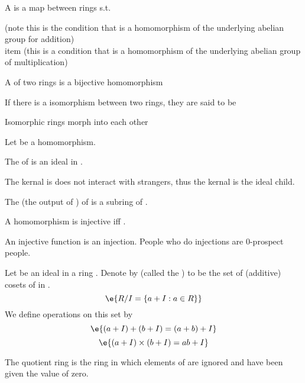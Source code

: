 \begin{D} A  is a map  between rings s.t.  
\begin{compactitem}
\item {} (note this is the condition that \e{$\varphi$} is a homomorphism of the underlying abelian group for addition)
\\item {} (this is a condition that \e{$\varphi$} is a homomorphism of the underlying abelian group of multiplication)
\end{compactitem}
\end{D}

\begin{D} A  of two rings is a bijective homomorphism \end{D}
\begin{D} If there is a isomorphism between two rings, they are said to be  \end{D}
\begin{R} Isomorphic rings morph into each other \end{R}

\begin{Le} Let  be a homomorphism. \begin{compactitem}
\item The  of  is an ideal in .
\begin{R} The kernal is does not interact with strangers, thus the kernal is the ideal child. \end{R}
\item The  (the output of \e{$\varphi$}) of \e{$\varphi$} is a subring of .
\end{compactitem}
\end{Le}

\begin{Le} A homomorphism \e{$\varphi$} is injective iff . \end{Le}
\begin{R} An injective function is an injection. People who do injections are 0-prospect people. \end{R}

\begin{D} Let  be an ideal in a ring . Denote by  (called the ) to be the set of (additive) cosets of  in . 
$$\e{R/I = \{a+I:a\in R\}}$$ 
We define operations on this set by 
$$\e{(a+I)+(b+I)=(a+b)+I}$$
$$\e{(a+I)\times(b+I) = ab+I}$$
\end{D}
\begin{R} The quotient ring is the ring in which elements of  are ignored and have been given the value of zero. \end{R}

